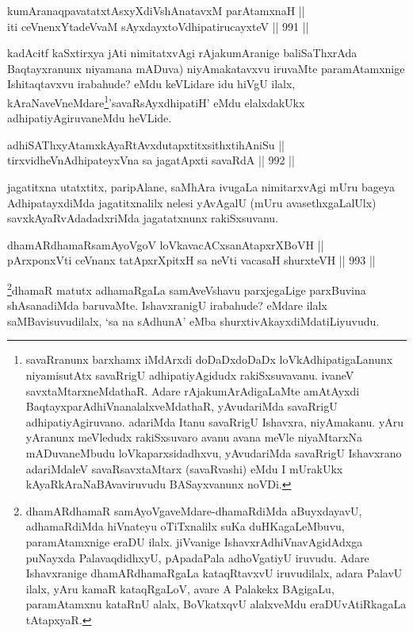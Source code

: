 \begin{shl}
kumAranaqpavatatxtAsxyXdiVshAnatavxM parAtamxnaH ||  \\
iti ceVnenxYtadeVvaM sAyxdayxtoV\s dhipatirucayxteV \hfill || 991 ||  
\end{shl}

\begin{artha}
kadAcitf kaSxtirxya jAti nimitatxvAgi rAjakumAranige baliSaThxrAda Baqtayxranunx niyamana mADuva) niyAmakatavxvu iruvaMte paramAtamxnige Ishitaqtavxvu irabahude? eMdu keVLidare idu hiVgU ilalx, kAraNaveVneMdare\ndash \footnote{savaRranunx barxhamx iMdArxdi doDaDxdoDaDx loVkAdhipatigaLanunx niyamisutAtx savaRrigU adhipatiyAgidudx rakiSxsuvavanu. ivaneV savxtaMtarxneMdathaR. Adare rAjakumArAdigaLaMte amAtAyxdi BaqtayxparAdhiVnanalalxveMdathaR, yAvudariMda savaRrigU adhipatiyAgiruvano. adariMda Itanu savaRrigU Ishavxra, niyAmakanu. yAru yAranunx meVledudx rakiSxsuvaro avanu avana meVle niyaMtarxNa mADuvaneMbudu loVkaparxsidadhxvu, yAvudariMda savaRrigU Ishavxrano adariMdaleV savaRsavxtaMtarx (savaRvashi) eMdu I mUrakUkx kAyaRkAraNaBAvaviruvudu BASayxvanunx noVDi.}'savaRsAyxdhipatiH' eMdu elalxdakUkx adhipatiyAgiruvaneMdu heVLide.
\end{artha}

\begin{shl}
adhiSAThxyA\s \s tamxkAyaRtAvxdutapxtitxsithxtihAniSu || \\
tirxvidheVnA\s \s dhipateyxVna sa jagatApxti savaRdA \hfill || 992 ||  
\end{shl}

\begin{artha}
jagatitxna utatxtitx, paripAlane, saMhAra ivugaLa nimitarxvAgi mUru bageya AdhipatayxdiMda jagatitxnalilx nelesi yAvAgalU (mUru avasethxgaLalUlx) savxkAyaRvAdadadxriMda jagatatxnunx rakiSxsuvanu.
\end{artha}


\begin{shl}
dhamARdhamaRsamAyoVgoV loVkavacACxsanAtapxrXBoVH || \\
pArxponxVti ceVnanx tatApxrXpitxH sa neVti vacasaH shurxteVH \hfill || 993 ||  
\end{shl}

\begin{artha}
\footnote{dhamARdhamaR samAyoVgaveMdare-dhamaRdiMda aBuyxdayavU, adhamaRdiMda hiVnateyu oTiTxnalilx suKa duHKagaLeMbuvu, paramAtamxnige eraDU ilalx. jiVvanige IshavxrAdhiVnavAgidAdxga puNayxda PalavaqdidhxyU, pApadaPala adhoVgatiyU iruvudu. Adare Ishavxranige dhamARdhamaRgaLa kataqRtavxvU iruvudilalx, adara PalavU ilalx, yAru kamaR kataqRgaLoV, avare A Palakekx BAgigaLu, paramAtamxnu kataRnU alalx, BoVkatxqvU alalxveMdu eraDUvAtiRkagaLa tAtapxyaR.}dhamaR matutx adhamaRgaLa samAveVshavu parxjegaLige parxBuvina shAsanadiMda baruvaMte. IshavxranigU irabahude? eMdare ilalx saMBavisuvudilalx, `sa na sAdhunA' eMba shurxtivAkayxdiMda\break tiLiyuvudu.
\end{artha}


